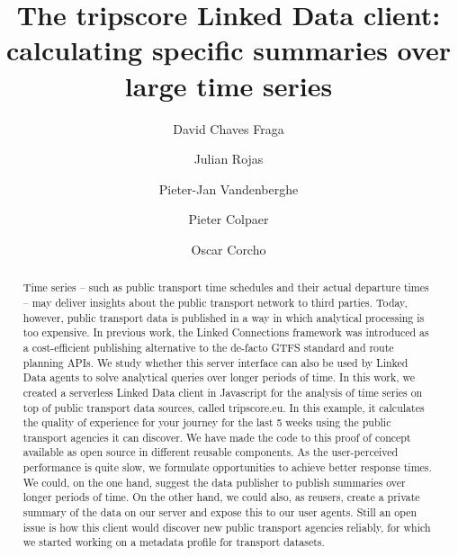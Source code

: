 \documentclass[runningheads,a4paper]{llncs}
\begin{document}
\mainmatter

\title{The tripscore Linked Data client: calculating specific summaries over large time series}
\author{David Chaves Fraga \and
Julian Rojas \and
Pieter-Jan Vandenberghe \and
Pieter Colpaer \and
Oscar Corcho}
\maketitle

\begin{abstract}
Time series -- such as public transport time schedules and their actual departure times -- may deliver insights about the public transport network to third parties. Today, however, public transport data is published in a way in which analytical processing is too expensive. In previous work, the Linked Connections framework was introduced as a cost-efficient publishing alternative to the de-facto GTFS standard and route planning APIs. We study whether this server interface can also be used by Linked Data agents to solve analytical queries over longer periods of time. In this work, we created a serverless Linked Data client in Javascript for the analysis of time series on top of public transport data sources, called tripscore.eu. In this example, it calculates the quality of experience for your journey for the last 5 weeks using the public transport agencies it can discover. We have made the code to this proof of concept available as open source in different reusable components. As the user-perceived performance is quite slow, we formulate opportunities to achieve better response times. We could, on the one hand, suggest the data publisher to publish summaries over longer periods of time. On the other hand, we could also, as reusers, create a private summary of the data on our server and expose this to our user agents. Still an open issue is how this client would discover new public transport agencies reliably, for which we started working on a metadata profile for transport datasets.

\end{abstract}
\end{document}
